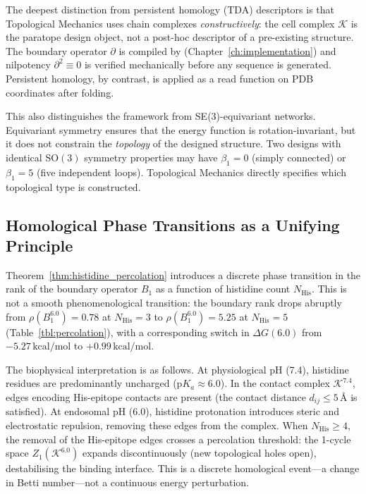 The deepest distinction from persistent homology (TDA) descriptors is that
Topological Mechanics uses chain complexes \emph{constructively}: the cell
complex $\mathcal{K}$ is the paratope design object, not a post-hoc descriptor
of a pre-existing structure.  The boundary operator $\partial$ is compiled by
\ToposLang{} (Chapter~\ref{ch:implementation}) and nilpotency
$\partial^2 \equiv 0$ is verified mechanically before any sequence is
generated.  Persistent homology, by contrast, is applied as a read function on
PDB coordinates after folding.

This also distinguishes the framework from SE(3)-equivariant networks.
Equivariant symmetry ensures that the energy function is rotation-invariant,
but it does not constrain the \emph{topology} of the designed structure.  Two
designs with identical $\mathrm{SO}(3)$ symmetry properties may have
$\beta_1 = 0$ (simply connected) or $\beta_1 = 5$ (five independent loops).
Topological Mechanics directly specifies which topological type is constructed.

\subsection{Homological Phase Transitions as a Unifying Principle}
\label{subsec:phase_transition_implications}

Theorem~\ref{thm:histidine_percolation} introduces a discrete phase transition
in the rank of the boundary operator $B_1$ as a function of histidine count
$N_{\text{His}}$.  This is not a smooth phenomenological transition: the
boundary rank drops abruptly from $\rho(B_1^{6.0}) = 0.78$ at
$N_{\text{His}} = 3$ to $\rho(B_1^{6.0}) = 5.25$ at $N_{\text{His}} = 5$
(Table~\ref{tbl:percolation}), with a corresponding switch in $\Delta G(6.0)$
from $-5.27\,\text{kcal/mol}$ to $+0.99\,\text{kcal/mol}$.

The biophysical interpretation is as follows.  At physiological pH (7.4),
histidine residues are predominantly uncharged ($\mathrm{p}K_a \approx 6.0$).
In the contact complex $\mathcal{K}^{7.4}$, edges encoding His-epitope contacts
are present (the contact distance $d_{ij} \le 5\,\text{\AA}$ is satisfied).
At endosomal pH (6.0), histidine protonation introduces steric and
electrostatic repulsion, removing these edges from the complex.  When
$N_{\text{His}} \ge 4$, the removal of the His-epitope edges crosses a
percolation threshold: the 1-cycle space $Z_1(\mathcal{K}^{6.0})$ expands
discontinuously (new topological holes open), destabilising the binding
interface.  This is a discrete homological event---a change in Betti
number---not a continuous energy perturbation.

